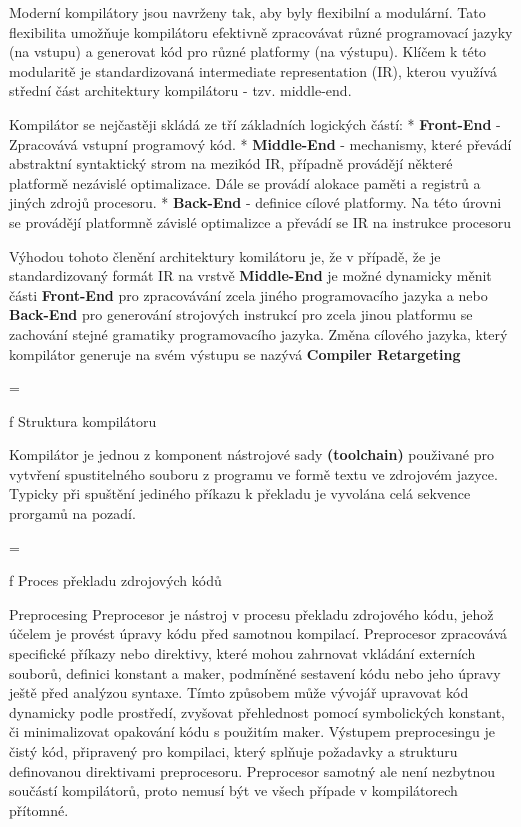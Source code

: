 Moderní kompilátory jsou navrženy tak, aby byly flexibilní a modulární. Tato flexibilita umožňuje kompilátoru efektivně zpracovávat různé programovací jazyky (na vstupu) a generovat kód pro různé platformy (na výstupu). Klíčem k této modularitě je standardizovaná intermediate representation (IR), kterou využívá střední část architektury kompilátoru - tzv. middle-end. 

Kompilátor se nejčastěji skládá ze tří základních logických částí:
\begitems
* {\bf Front-End} - Zpracovává vstupní programový kód.
* {\bf Middle-End} - mechanismy, které převádí abstraktní syntaktický strom na mezikód IR, případně provádějí některé platformě nezávislé optimalizace. Dále se provádí alokace paměti a registrů a jiných zdrojů procesoru. 
* {\bf Back-End} - definice cílové platformy. Na této úrovni se provádějí platformně závislé optimalizce a převádí se IR na instrukce procesoru
\enditems

Výhodou tohoto členění architektury komilátoru je, že v případě, že je standardizovaný formát IR na vrstvě {\bf Middle-End} je možné dynamicky měnit části {\bf Front-End} pro zpracovávání zcela jiného programovacího jazyka a nebo {\bf Back-End} pro generování strojových instrukcí pro zcela jinou platformu se zachování stejné gramatiky programovacího jazyka. Změna cílového jazyka, který kompilátor generuje na svém výstupu se nazývá {\bf Compiler Retargeting} 


\vskip 5mm
\picw=\hsize \centerline{ }\nobreak\medskip
\caption/f Struktura kompilátoru


Kompilátor je jednou z komponent nástrojové sady {\bf (toolchain)} použivané pro vytvření spustitelného souboru z programu ve formě textu ve zdrojovém jazyce. Typicky při spuštění jediného příkazu k překladu je vyvolána celá sekvence prorgamů na pozadí. 

\vskip 5mm
\picw=\hsize \centerline{ }\nobreak\medskip
\caption/f Proces překladu zdrojových kódů

\secc Preprocesing
Preprocesor je nástroj v procesu překladu zdrojového kódu, jehož účelem je provést úpravy kódu před samotnou kompilací. Preprocesor zpracovává specifické příkazy nebo direktivy, které mohou zahrnovat vkládání externích souborů, definici konstant a maker, podmíněné sestavení kódu nebo jeho úpravy ještě před analýzou syntaxe. Tímto způsobem může vývojář upravovat kód dynamicky podle prostředí, zvyšovat přehlednost pomocí symbolických konstant, či minimalizovat opakování kódu s použitím maker. Výstupem preprocesingu je čistý kód, připravený pro kompilaci, který splňuje požadavky a strukturu definovanou direktivami preprocesoru. Preprocesor samotný ale není nezbytnou součástí kompilátorů, proto nemusí být ve všech případe v kompilátorech přítomné.

